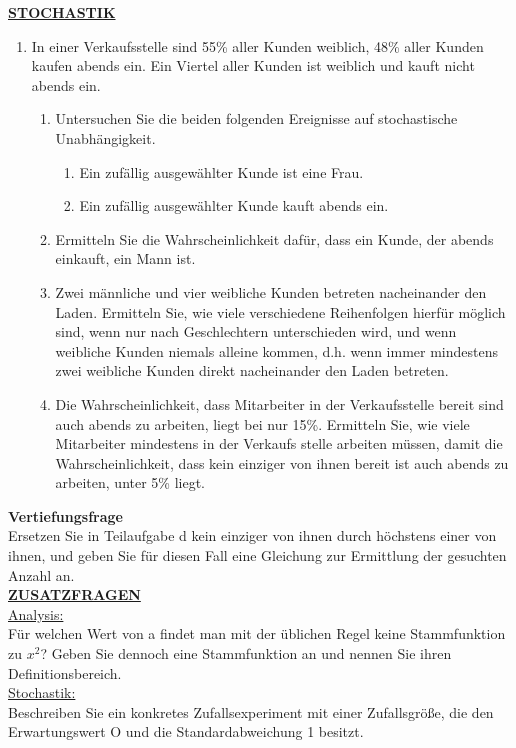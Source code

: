 \documentclass[a4paper,12pt]{article}
\begin{document}
\underline{\textbf{STOCHASTIK}}\\
\begin{enumerate}
  \item In einer Verkaufsstelle sind 55\% aller Kunden weiblich, 48\% aller Kunden kaufen abends ein. Ein Viertel aller Kunden ist weiblich und kauft nicht abends ein.\\
  \begin{enumerate}[label={\alph*)}]
    \item Untersuchen Sie die beiden folgenden Ereignisse auf stochastische Unabhängigkeit.
    \begin{enumerate}[label={\Alph*:}]
      \item \glqq Ein zufällig ausgewählter Kunde ist eine Frau.\grqq
      \item \glqq Ein zufällig ausgewählter Kunde kauft abends ein.\grqq
    \end{enumerate}
    
    \item Ermitteln Sie die Wahrscheinlichkeit dafür, dass ein Kunde, der abends einkauft, ein Mann ist.

    \item Zwei männliche und vier weibliche Kunden betreten nacheinander den Laden. Ermitteln Sie, wie viele verschiedene Reihenfolgen hierfür möglich sind, wenn nur nach Geschlechtern unterschieden wird, und wenn weibliche Kunden niemals alleine kommen, d.h. wenn immer mindestens zwei weibliche Kunden direkt nacheinander den Laden betreten.

    \item Die Wahrscheinlichkeit, dass Mitarbeiter in der Verkaufsstelle bereit sind auch abends zu arbeiten, liegt bei nur 15\%. Ermitteln Sie, wie viele Mitarbeiter mindestens in der Verkaufs stelle arbeiten müssen, damit die Wahrscheinlichkeit, dass kein einziger von ihnen bereit ist auch abends zu arbeiten, unter 5\% liegt.
  \end{enumerate}
\end{enumerate}

\textbf{Vertiefungsfrage}\\
Ersetzen Sie in Teilaufgabe d \glqq kein einziger von ihnen\grqq{} durch \glqq höchstens einer von ihnen\grqq{}, und geben Sie für diesen Fall eine Gleichung zur Ermittlung der gesuchten Anzahl an.\\

\underline{\textbf{ZUSATZFRAGEN}}\\

\underline{Analysis:}\\
Für welchen Wert von a findet man mit der üblichen Regel keine Stammfunktion zu $x^2$? Geben Sie dennoch eine Stammfunktion an und nennen Sie ihren Definitionsbereich.\\

\underline{Stochastik:}\\
Beschreiben Sie ein konkretes Zufallsexperiment mit einer Zufallsgröße, die den Erwartungswert O und die Standardabweichung 1 besitzt.
\end{document}
